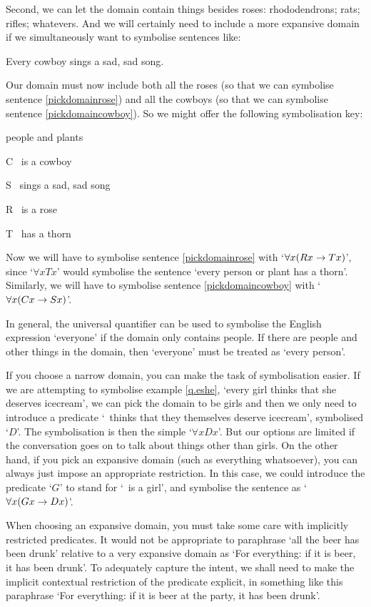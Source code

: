 Second, we can let the domain contain things besides roses: rhododendrons; rats; rifles; whatevers.  And we will certainly need to include a more expansive domain if we simultaneously want to symbolise sentences like:
	\begin{earg}
		\item[\ex{pickdomaincowboy}] Every cowboy sings a sad, sad song.
	\end{earg}
Our domain must now include both all the roses (so that we can symbolise sentence \ref{pickdomainrose}) and all the cowboys (so that we can symbolise sentence \ref{pickdomaincowboy}). So we might offer the following symbolisation key:\label{poison}
	\begin{ekey}
		\item[\text{domain}] people and plants
		\item[C] \blank\ is a cowboy
		\item[S] \blank\ sings a sad, sad song
		\item[R] \blank\ is a rose
		\item[T] \blank\ has a thorn
	\end{ekey}
Now we will have to symbolise sentence \ref{pickdomainrose} with `$\forall x (Rx \rightarrow Tx)$', since `$\forall x Tx$' would symbolise the sentence `every person or plant has a thorn'. Similarly, we will have to symbolise sentence \ref{pickdomaincowboy} with `$\forall x (Cx \rightarrow Sx)$'. 

In general, the universal quantifier can be used to symbolise the English expression `everyone' if the domain only contains people. If there are people and other things in the domain, then `everyone' must be treated as `every person'.

If you choose a narrow domain, you can make the task of symbolisation easier. If we are attempting to symbolise example \ref{q.eshe}, `every girl thinks that she deserves icecream', we can pick the domain to be girls and then we only need to introduce a predicate `\blank\ thinks that they themselves deserve icecream', symbolised `$D$'. The symbolisation is then the simple `$\forall x Dx$'. But our options are limited if the conversation goes on to talk about things other than girls. On the other hand, if you pick an expansive domain (such as everything whatsoever), you can always just impose an appropriate restriction. In this case, we could introduce the predicate `$G$' to stand for `\blank\ is a girl', and symbolise the sentence as `$\forall x (Gx \rightarrow Dx)$'. 

When choosing an expansive domain, you must take some care with implicitly restricted predicates. It would not be appropriate to paraphrase `all the beer has been drunk' relative to a very expansive domain as `For everything: if it is beer, it has been drunk'. To adequately capture the intent, we shall need to make the implicit contextual restriction of the predicate explicit, in something like this paraphrase `For everything: if it is beer at the party, it has been drunk'.


